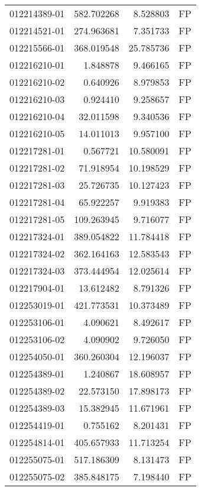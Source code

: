 \begin{tabular}{lrrl}
012214389-01 &  582.702268 &       8.528803 &   FP \\
012214521-01 &  274.963681 &       7.351733 &   FP \\
012215566-01 &  368.019548 &      25.785736 &   FP \\
012216210-01 &    1.848878 &       9.466165 &   FP \\
012216210-02 &    0.640926 &       8.979853 &   FP \\
012216210-03 &    0.924410 &       9.258657 &   FP \\
012216210-04 &   32.011598 &       9.340536 &   FP \\
012216210-05 &   14.011013 &       9.957100 &   FP \\
012217281-01 &    0.567721 &      10.580091 &   FP \\
012217281-02 &   71.918954 &      10.198529 &   FP \\
012217281-03 &   25.726735 &      10.127423 &   FP \\
012217281-04 &   65.922257 &       9.919383 &   FP \\
012217281-05 &  109.263945 &       9.716077 &   FP \\
012217324-01 &  389.054822 &      11.784418 &   FP \\
012217324-02 &  362.164163 &      12.583543 &   FP \\
012217324-03 &  373.444954 &      12.025614 &   FP \\
012217904-01 &   13.612482 &       8.791326 &   FP \\
012253019-01 &  421.773531 &      10.373489 &   FP \\
012253106-01 &    4.090621 &       8.492617 &   FP \\
012253106-02 &    4.090902 &       9.726050 &   FP \\
012254050-01 &  360.260304 &      12.196037 &   FP \\
012254389-01 &    1.240867 &      18.608957 &   FP \\
012254389-02 &   22.573150 &      17.898173 &   FP \\
012254389-03 &   15.382945 &      11.671961 &   FP \\
012254419-01 &    0.755162 &       8.201431 &   FP \\
012254814-01 &  405.657933 &      11.713254 &   FP \\
012255075-01 &  517.186309 &       8.131473 &   FP \\
012255075-02 &  385.848175 &       7.198440 &   FP \\

\end{tabular}
